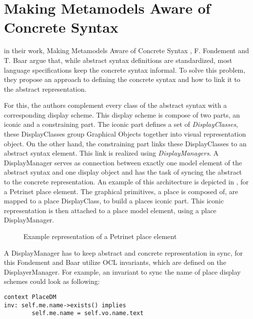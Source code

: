 \section{Making Metamodels Aware of Concrete Syntax}
\label{sec:fondement}
in their work, Making Metamodels Aware of Concrete Syntax \cite{fondement_making_2005}, F. Fondement and T. Baar argue that, while abstract syntax definitions are standardized, most language specifications keep the concrete syntax informal. To solve this problem, they propose an approach to defining the concrete syntax and how to link it to the abstract representation.

For this, the authors complement every class of the abstract syntax with a corresponding display scheme. This display scheme is compose of two parts, an iconic and a constraining part. The iconic part defines a set of \emph{DisplayClasses}, these DisplayClasses group Graphical Objects together into visual representation object. On the other hand, the constraining part links these DisplayClasses to an abstract syntax element. This link is realized using \emph{DisplayManagers}. A DisplayManager serves as connection between exactly one model element of the abstract syntax and one display object and has the task of syncing the abstract to the concrete representation. An example of this architecture is depicted in , for a Petrinet place element. The graphical primitives, a place is composed of, are mapped to a place DisplayClass, to build a places iconic part. This iconic representation is then attached to a place model element, using a place DisplayManager.


\begin{figure}[H]
  \centering
  
  \caption{Example representation of a Petrinet place element}
  \label{fig:fondement_dm}
\end{figure}

A DisplayManager has to keep abstract and concrete representation in sync, for this Fondement and Baar utilize OCL invariants, which are defined on the DisplayerManager. For example, an invariant to sync the name of place display schemes could look as following:

\begin{lstlisting}[language=OCL,captionpos=b,caption={OCL Invariant that syncs the name attribute of Place DisplayClasss and model elements.},label={lst:ocl-inv}]
context PlaceDM
inv: self.me.name->exists() implies
        self.me.name = self.vo.name.text
\end{lstlisting}

